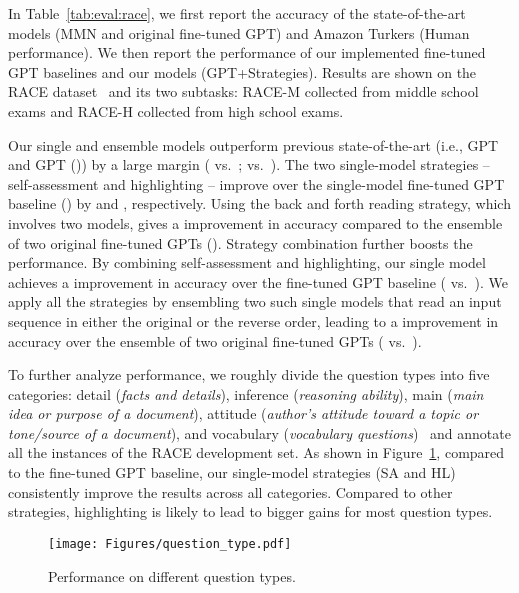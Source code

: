 \documentclass[11pt,a4paper]{article}
\newcommand{\ie}{{i.e.}}
\newcommand{\vs}{{vs.}}
\begin{document}
In Table~\ref{tab:eval:race}, we first report the accuracy of the state-of-the-art models (MMN and original fine-tuned GPT) and Amazon Turkers (Human performance). We then report the performance of our implemented fine-tuned GPT baselines and our models (GPT+Strategies). Results are shown on the RACE dataset~\cite{lai2017race} and its two subtasks: RACE-M collected from middle school exams and RACE-H collected from high school exams.

Our single and ensemble models outperform previous state-of-the-art (\ie, GPT and GPT ()) by a large margin ( \vs~;  \vs~). 
The two single-model strategies -- self-assessment and highlighting -- improve over the single-model fine-tuned GPT baseline () by  and , respectively. 
Using the back and forth reading strategy, which involves two models, gives a  improvement in accuracy compared to the ensemble of two original fine-tuned GPTs  (). Strategy combination further boosts the performance. By combining self-assessment and highlighting, our single
model achieves a  improvement in accuracy over the fine-tuned GPT baseline ( \vs~). We apply all the strategies by ensembling two such single models that read an input sequence in either the original or the reverse order, leading to a  improvement in accuracy over the ensemble of two original fine-tuned GPTs ( \vs~). 

To further analyze performance, we roughly divide the question types into five categories: detail (\emph{facts and details}), inference (\emph{reasoning ability}), main (\emph{main idea or purpose of a document}), attitude (\emph{author's attitude toward a topic or tone/source of a document}), and vocabulary (\emph{vocabulary questions})~\cite{qian2004evaluation,lai2017race} and annotate all the instances of the RACE development set. As shown in Figure~\ref{fig:eval:question_type}, compared to the fine-tuned GPT baseline, our single-model strategies (SA and HL) consistently improve the results across all categories. Compared to other strategies, highlighting is likely to lead to bigger gains for most question types.








\begin{figure}[!h]
   \begin{center}
   \texttt{[image: Figures/question\_type.pdf]}
\end{center}
 \caption{Performance on different question types.}
 \label{fig:eval:question_type}
\end{figure}
\end{document}
